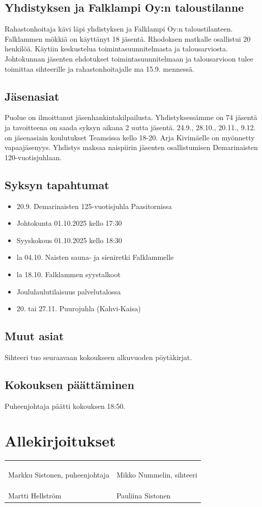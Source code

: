\documentclass[a4paper,12pt]{article}
\begin{document}
\subsection{Yhdistyksen ja Falklampi Oy:n taloustilanne}
Rahastonhoitaja kävi läpi yhdistyksen ja Falklampi Oy:n taloustilanteen. Falklammen mökkiä on käyttänyt 18 jäsentä. Rhodoksen matkalle osallistui 20 henkilöä. Käytiin keskustelua toimintasuunnitelmasta ja talousarviosta. Johtokunnan jäsenten ehdotukset toimintasuunnitelmaan ja talousarvioon tulee toimittaa sihteerille ja rahastonhoitajalle ma 15.9. mennessä.
\subsection{Jäsenasiat}
Puolue on ilmoittanut jäsenhankintakilpailusta. Yhdistyksessämme on 74 jäsentä ja tavoitteena on saada syksyn aikana 2 uutta jäsentä. 24.9., 28.10., 20.11., 9.12. on jäsenasiain koulutukset Teamsissa kello 18-20. Arja Kivimäelle on myönnetty vapaajäsenyys. Yhdistys maksaa naispiirin jäsenten osallistumisen Demarinaisten 120-vuotisjuhlaan.
\subsection{Syksyn tapahtumat}
\begin{itemize}
\item{20.9. Demarinaisten 125-vuotisjuhla Paasitornissa}
\item{Johtokunta 01.10.2025 kello 17:30}
\item{Syyskokous 01.10.2025 kello 18:30}
\item{la 04.10. Naisten sauna- ja sieniretki Falklammelle}
\item{la 18.10. Falklammen syystalkoot}
\item{Joululaulutilaisuus palvelutalossa}
\item{20. tai 27.11. Puurojuhla (Kahvi-Kaisa)}
\end{itemize}
\subsection{Muut asiat}
Sihteeri tuo seuraavaan kokoukseen alkuvuoden pöytäkirjat.
\subsection{Kokouksen päättäminen}
Puheenjohtaja päätti kokouksen 18:50.
\section*{Allekirjoitukset}
\begin{flushleft}
\begin{tabular}{ll}
& \\
& \\
& \\
Markku Sistonen, puheenjohtaja &
Mikko Nummelin, sihteeri \\
& \\
& \\
& \\
Martti Hellström &
Pauliina Sistonen
\end{tabular}
\end{flushleft}
\end{document}
